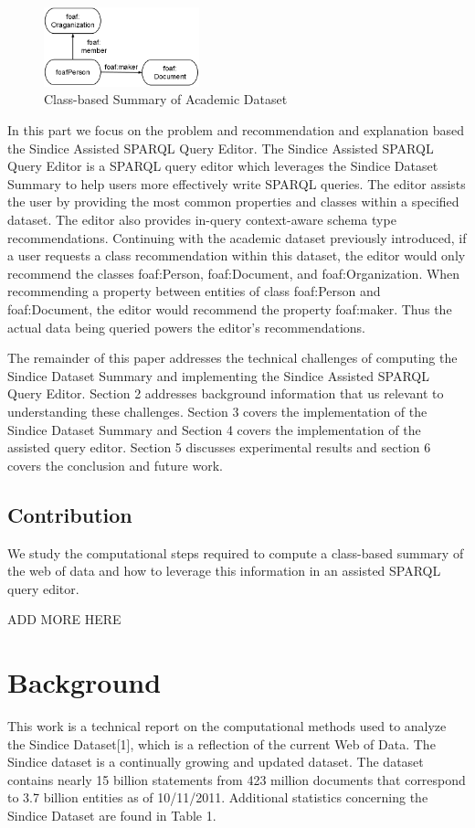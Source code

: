 \documentclass[11pt,onecolumn]{article}
\begin{document}
\begin{figure}
  \centering
    \includegraphics[width=0.40\textwidth]{Diagram2.png}
    \caption{Class-based Summary of Academic Dataset}
\end{figure}



In this part we focus on the problem and recommendation and explanation based the Sindice Assisted SPARQL Query Editor.  The Sindice Assisted SPARQL Query Editor is a SPARQL query editor which leverages the Sindice Dataset Summary to help users more effectively write SPARQL queries. The editor assists the user by  providing the most common properties and classes within a specified dataset.  The editor also provides in-query context-aware schema type recommendations.  Continuing with the academic dataset previously introduced, if a user requests a class recommendation within this dataset, the editor would only recommend the classes foaf:Person, foaf:Document, and foaf:Organization.  When recommending a property between entities of class foaf:Person and foaf:Document, the editor would recommend the property foaf:maker.  Thus the actual data being queried powers the editor's recommendations.


The remainder of this paper addresses the technical challenges of computing the Sindice Dataset Summary and implementing the Sindice Assisted SPARQL Query Editor.  Section 2 addresses background information that us relevant to understanding these challenges.  Section 3 covers the implementation of the Sindice Dataset Summary and Section 4 covers the implementation of the assisted query editor.  Section 5 discusses experimental results and section 6 covers the conclusion and future work.

\subsection{Contribution}
We study the computational steps required to compute a class-based summary of the web of data and how to leverage this information in an assisted SPARQL query editor.

ADD MORE HERE

\section{Background}
This work is a technical report on the computational methods used to analyze the Sindice Dataset[1], which is a reﬂection of the current Web of Data.  The Sindice dataset is a continually growing and updated dataset. The dataset contains nearly 15 billion statements from 423 million documents that correspond to 3.7 billion entities as of 10/11/2011.  Additional statistics concerning the Sindice Dataset are found in Table 1.
\end{document}
